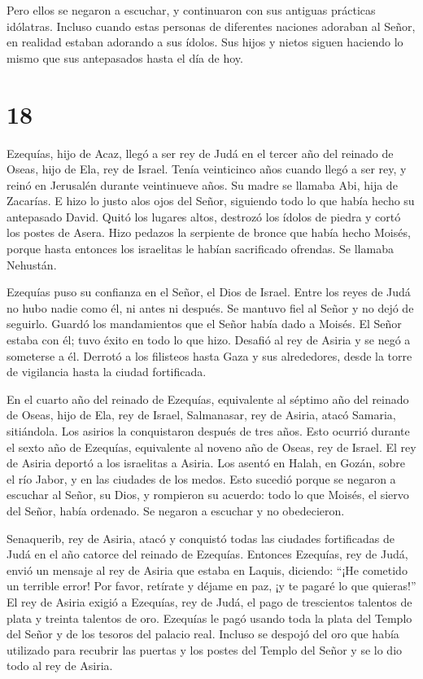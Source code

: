  Pero ellos se negaron a escuchar, y continuaron con sus
antiguas prácticas idólatras.  Incluso cuando estas
personas de diferentes naciones adoraban al Señor, en realidad estaban
adorando a sus ídolos. Sus hijos y nietos siguen haciendo lo mismo que
sus antepasados hasta el día de hoy.

\hypertarget{section-17}{%
\section{18}\label{section-17}}

 Ezequías, hijo de Acaz, llegó a ser rey de Judá en el
tercer año del reinado de Oseas, hijo de Ela, rey de Israel.
 Tenía veinticinco años cuando llegó a ser rey, y reinó en
Jerusalén durante veintinueve años. Su madre se llamaba Abi, hija de
Zacarías.  E hizo lo justo alos ojos del Señor, siguiendo
todo lo que había hecho su antepasado David.  Quitó los
lugares altos, destrozó los ídolos de piedra y cortó los postes de
Asera. Hizo pedazos la serpiente de bronce que había hecho Moisés,
porque hasta entonces los israelitas le habían sacrificado ofrendas. Se
llamaba Nehustán.

 Ezequías puso su confianza en el Señor, el Dios de Israel.
Entre los reyes de Judá no hubo nadie como él, ni antes ni después.
 Se mantuvo fiel al Señor y no dejó de seguirlo. Guardó los
mandamientos que el Señor había dado a Moisés.  El Señor
estaba con él; tuvo éxito en todo lo que hizo. Desafió al rey de Asiria
y se negó a someterse a él.  Derrotó a los filisteos hasta
Gaza y sus alrededores, desde la torre de vigilancia hasta la ciudad
fortificada.

 En el cuarto año del reinado de Ezequías, equivalente al
séptimo año del reinado de Oseas, hijo de Ela, rey de Israel,
Salmanasar, rey de Asiria, atacó Samaria, sitiándola.  Los
asirios la conquistaron después de tres años. Esto ocurrió durante el
sexto año de Ezequías, equivalente al noveno año de Oseas, rey de
Israel.  El rey de Asiria deportó a los israelitas a
Asiria. Los asentó en Halah, en Gozán, sobre el río Jabor, y en las
ciudades de los medos.  Esto sucedió porque se negaron a
escuchar al Señor, su Dios, y rompieron su acuerdo: todo lo que Moisés,
el siervo del Señor, había ordenado. Se negaron a escuchar y no
obedecieron.

 Senaquerib, rey de Asiria, atacó y conquistó todas las
ciudades fortificadas de Judá en el año catorce del reinado de Ezequías.
 Entonces Ezequías, rey de Judá, envió un mensaje al rey de
Asiria que estaba en Laquis, diciendo: ``¡He cometido un terrible error!
Por favor, retírate y déjame en paz, ¡y te pagaré lo que quieras!'' El
rey de Asiria exigió a Ezequías, rey de Judá, el pago de trescientos
talentos de plata y treinta talentos de oro.  Ezequías le
pagó usando toda la plata del Templo del Señor y de los tesoros del
palacio real.  Incluso se despojó del oro que había
utilizado para recubrir las puertas y los postes del Templo del Señor y
se lo dio todo al rey de Asiria.

